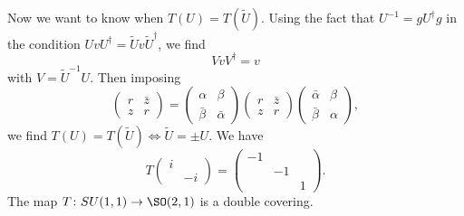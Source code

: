 Now we want to know when $T(U)=T(\tilde U)$. Using the fact that $U^{-1}=gU^{\dag}g$ in the condition $UvU^{\dag}=\tilde Uv\tilde U^{\dag}$, we find
\[ 
  VvV^{\dag}=v
\]
with $V=\tilde U^{-1}U$. Then imposing
\[ 
  \begin{pmatrix}
r&\bar z\\z&r
\end{pmatrix}=
\begin{pmatrix}
\alpha&\beta\\\bar\beta&\bar\alpha
\end{pmatrix}
\begin{pmatrix}
r&\bar z\\z&r
\end{pmatrix}
\begin{pmatrix}
\bar \alpha&\beta\\\bar\beta&\alpha
\end{pmatrix},
\]
we find $T(U)=T(\tilde U)\Leftrightarrow \tilde U=\pm U$. We have
\[ 
  T\begin{pmatrix}
i\\&-i
\end{pmatrix}
=
\begin{pmatrix}
-1\\&-1\\&&1
\end{pmatrix}.
\]
The map $T\colon SU(1,1)\to \SO(2,1)$ is a double covering.

